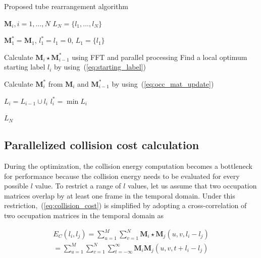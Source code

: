 \documentclass[11pt]{hyu_thesis}
\begin{document}
\begin{algorithm}[t]
\caption{Proposed tube rearrangement algorithm}
\label{alg:proposed}

\begin{algorithmic}
\REQUIRE $\textbf{M}_{i}, i = 1,...,N$
\ENSURE $L_{N} = \{ l_{1},...,l_{N} \}$

\STATE $\textbf{M}_{1}^{*} = \textbf{M}_{1}$, $l_{1}^{*} = l_{1} = 0$, $L_{1} = \{ l_{1} \}$

	\STATE Calculate $\textbf{M}_{i} \star \textbf{M}_{i-1}^{*}$ using FFT and parallel processing
	\STATE Find a local optimum starting label $l_{i}$ by using~(\ref{eq:starting_label})

	\STATE Calculate $\textbf{M}_{i}^{*}$ from $\textbf{M}_{i}$ and $\textbf{M}_{i-1}^{*}$ by using~(\ref{eq:occ_mat_update})

	\STATE $L_{i} = L_{i-1} \cup l_{i}$
	\STATE $l_{i}^{*} = \min L_{i}$
\ENDFOR

\RETURN $L_{N}$
\end{algorithmic}

\end{algorithm}

\subsection{Parallelized collision cost calculation}
During the optimization, the collision energy computation becomes a bottleneck for performance because the collision energy needs to be evaluated for every possible $l$ value. To restrict a range of $l$ values, let us assume that two occupation matrices overlap by at least one frame in the temporal domain. Under this restriction,~(\ref{eq:collision_cost}) is simplified by adopting a cross-correlation of two occupation matrices in the temporal domain as

\begin{equation}
\label{eq:collision_cost_pp}
\begin{aligned}
E_C(l_i, l_j) = \sum_{u=1}^{M} \sum_{v=1}^{N} \textbf{M}_{i} \star \textbf{M}_{j}(u, v, l_i - l_j)\\
= \sum_{u=1}^{M} \sum_{v=1}^{N} \sum_{t=-\infty}^{\infty} \textbf{M}_{i}\textbf{M}_{j}(u, v, t + l_i - l_j)
\end{aligned}
\end{equation}
\end{document}
